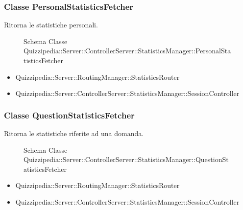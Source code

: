 \subsubsection{Classe PersonalStatisticsFetcher}
Ritorna le statistiche personali.
\begin{figure}[H]
\centering
\noindent{}
\caption{Schema Classe Quizzipedia::Server::ControllerServer::StatisticsManager::PersonalStatisticsFetcher}
\end{figure}
\begin{itemize}
\item Quizzipedia::Server::RoutingManager::StatisticsRouter
\end{itemize}
\begin{itemize}
\item Quizzipedia::Server::ControllerServer::StatisticsManager::SessionController
\end{itemize}
\subsubsection{Classe QuestionStatisticsFetcher}
Ritorna le statistiche riferite ad una domanda.
\begin{figure}[H]
\centering
\noindent{}
\caption{Schema Classe Quizzipedia::Server::ControllerServer::StatisticsManager::QuestionStatisticsFetcher}
\end{figure}
\begin{itemize}
\item Quizzipedia::Server::RoutingManager::StatisticsRouter
\end{itemize}
\begin{itemize}
\item Quizzipedia::Server::ControllerServer::StatisticsManager::SessionController
\end{itemize}
